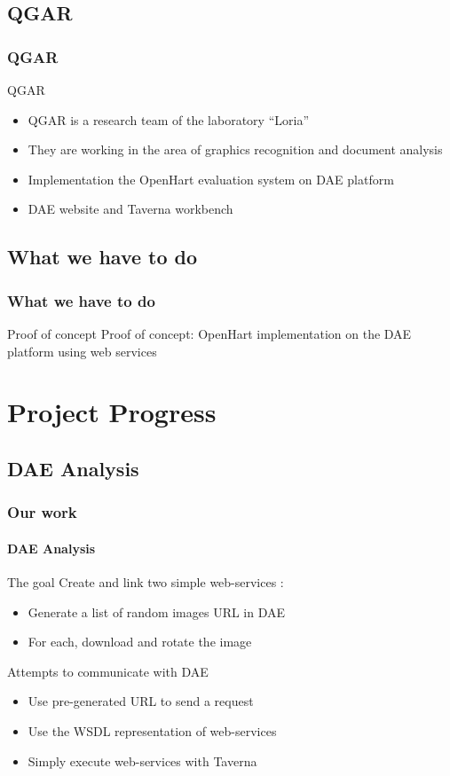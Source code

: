 \documentclass[c]{beamer}
\begin{document}
\subsection{QGAR}
\begin{frame}
   \frametitle{ QGAR }
   \begin{block}{QGAR}
   \begin{itemize}
	   \item QGAR is a research team of the laboratory “Loria”
	   \item They are working in the area of graphics recognition and document analysis
	   \item Implementation the OpenHart evaluation system on DAE platform
	   \item DAE website and Taverna workbench
	\end{itemize}
	\end{block}
\end{frame}

\subsection{What we have to do}

\begin{frame}
   \frametitle{ What we have to do}
	\begin{block}{Proof of concept}
	Proof of concept: OpenHart implementation on the DAE platform using web services
	\end{block}
\end{frame}
			    

\section{Project Progress}

\subsection{DAE Analysis}
\begin{frame}

\frametitle{Our work}
\framesubtitle{DAE Analysis}
\begin{block}{The goal}
Create and link two simple web-services : 
\begin{itemize}
\item Generate a list of random images URL in DAE
\item For each, download and rotate the image
\end{itemize}
\end{block}
\begin{block}{Attempts to communicate with DAE}
\begin{itemize}
\item Use pre-generated URL to send a request
\item Use the WSDL representation of web-services
\item Simply execute web-services with Taverna
\end{itemize}
\end{block}
\end{frame}
\end{document}
